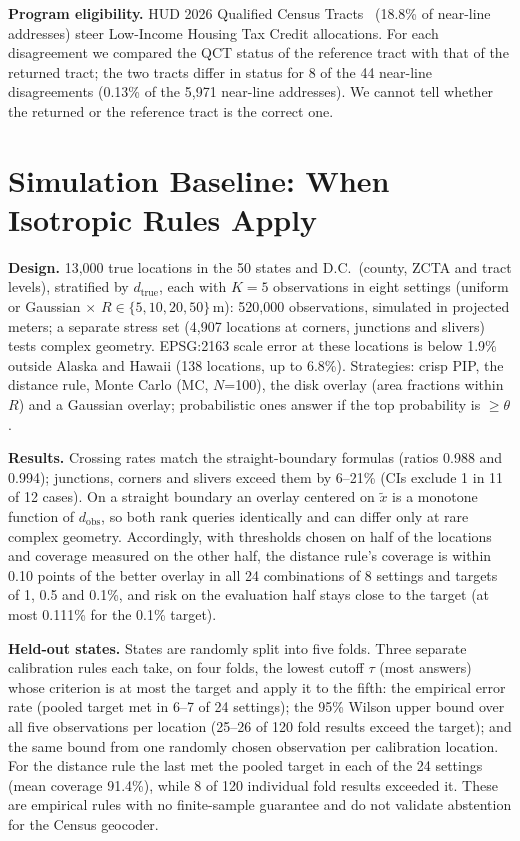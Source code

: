 \documentclass[runningheads]{llncs}
\begin{document}
\textbf{Program eligibility.} HUD 2026 Qualified Census Tracts~\cite{hudqct} (18.8\% of near-line addresses) steer Low-Income Housing Tax Credit allocations. For each disagreement we compared the QCT status of the reference tract with that of the returned tract; the two tracts differ in status for 8 of the 44 near-line disagreements (0.13\% of the 5{,}971 near-line addresses). We cannot tell whether the returned or the reference tract is the correct one.

\section{Simulation Baseline: When Isotropic Rules Apply}\label{sec:bench}\label{sec:sim}
\textbf{Design.} 13{,}000 true locations in the 50 states and D.C.\ (county, ZCTA and tract levels), stratified by $d_{\mathrm{true}}$, each with $K=5$ observations in eight settings (uniform or Gaussian $\times$ $R\in\{5,10,20,50\}$\,m): 520{,}000 observations, simulated in projected meters; a separate stress set (4{,}907 locations at corners, junctions and slivers) tests complex geometry. EPSG:2163 scale error at these locations is below 1.9\% outside Alaska and Hawaii (138 locations, up to 6.8\%). Strategies: crisp PIP, the distance rule, Monte Carlo (MC, $N$=100), the disk overlay (area fractions within $R$) and a Gaussian overlay; probabilistic ones answer if the top probability is $\ge\theta$.

\textbf{Results.} Crossing rates match the straight-boundary formulas (ratios 0.988 and 0.994); junctions, corners and slivers exceed them by 6--21\% (CIs exclude 1 in 11 of 12 cases). On a straight boundary an overlay centered on $\tilde x$ is a monotone function of $d_{\mathrm{obs}}$, so both rank queries identically and can differ only at rare complex geometry. Accordingly, with thresholds chosen on half of the locations and coverage measured on the other half, the distance rule's coverage is within 0.10 points of the better overlay in all 24 combinations of 8 settings and targets of 1, 0.5 and 0.1\%, and risk on the evaluation half stays close to the target (at most 0.111\% for the 0.1\% target).

\textbf{Held-out states.} States are randomly split into five folds. Three separate calibration rules each take, on four folds, the lowest cutoff $\tau$ (most answers) whose criterion is at most the target and apply it to the fifth: the empirical error rate (pooled target met in 6--7 of 24 settings); the 95\% Wilson upper bound over all five observations per location (25--26 of 120 fold results exceed the target); and the same bound from one randomly chosen observation per calibration location. For the distance rule the last met the pooled target in each of the 24 settings (mean coverage 91.4\%), while 8 of 120 individual fold results exceeded it. These are empirical rules with no finite-sample guarantee and do not validate abstention for the Census geocoder.
\end{document}
